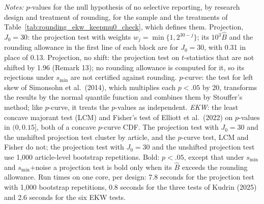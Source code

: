 \begin{table}[htbp]
\medskip
\begin{minipage}{\linewidth}
\footnotesize
\textit{Notes:} $p$-values for the null hypothesis of no selective reporting, by research design and treatment of rounding, for the sample and the treatments of Table~\ref{tab:rounding_ekw_keepmu0_check}, which defines them.
Projection, $J_0=30$: the projection test with weights $w_j=\min\{1,2^{30-j}\}$; its $10^3\widehat{B}$ and the rounding allowance in the first line of each block are for $J_0=30$, with 0.31 in place of 0.13.
Projection, no shift: the projection test on $t$-statistics that are not shifted by 1.96 (Remark 13); no rounding allowance is computed for it, so its rejections under $s_{\min}$ are not certified against rounding.
$p$-curve: the test for left skew of Simonsohn et al.\ (2014), which multiplies each $p<.05$ by 20, transforms the results by the normal quantile function and combines them by Stouffer's method; like $p$-curve, it treats the $p$-values as independent.
\textit{EKW}: the least concave majorant test (LCM) and Fisher's test of Elliott et al.\ (2022) on $p$-values in $(0,0.15]$, both of a concave $p$-curve CDF.
The projection test with $J_0=30$ and the unshifted projection test cluster by article, and the $p$-curve test, LCM and Fisher do not; the projection test with $J_0=30$ and the unshifted projection test use 1,000 article-level bootstrap repetitions.
Bold: $p<.05$, except that under $s_{\min}$ and $s_{\min}$+noise a projection test is bold only when its $\widehat{B}$ exceeds the rounding allowance.
Run times on one core, per design: 7.8 seconds for the projection test with 1,000 bootstrap repetitions, 0.8 seconds for the three tests of Kudrin (2025) and 2.6 seconds for the six EKW tests.
\end{minipage}
\end{table}
